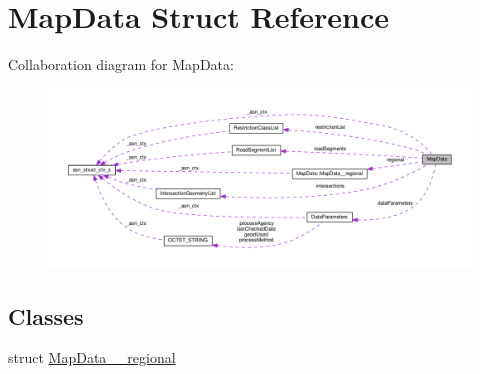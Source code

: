 \hypertarget{structMapData}{}\section{Map\+Data Struct Reference}
\label{structMapData}


Collaboration diagram for Map\+Data\+:\nopagebreak
\begin{figure}[H]
\begin{center}
\leavevmode
\includegraphics[width=350pt]{structMapData__coll__graph}
\end{center}
\end{figure}
\subsection*{Classes}
\begin{DoxyCompactItemize}
\item 
struct \hyperlink{structMapData_1_1MapData____regional}{Map\+Data\+\_\+\+\_\+regional}
\end{DoxyCompactItemize}
